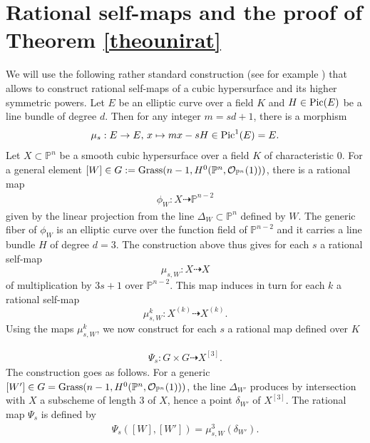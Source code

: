 \documentclass[10pt]{article}
\begin{document}
\section{Rational self-maps and the proof of Theorem \ref{theounirat}\label{sec1}}
 We will use the following  rather standard construction (see for example \cite{bogothschi}) that allows to construct rational self-maps of a cubic hypersurface and its higher symmetric powers. Let $E$ be an elliptic curve over a field $K$ and $H\in{\rm Pic}(E)$ be a line bundle of degree $d$. Then for any integer $m=sd+1$, there is a morphism
$$\mu_s:E\rightarrow E,\,x\mapsto mx-sH\in{\rm Pic}^1(E)=E.$$
Let $X\subset \mathbb{P}^n$ be a smooth cubic hypersurface over a field $K$ of characteristic $0$. For a general element $[W]\in G:={\rm Grass}(n-1, H^0(\mathbb{P}^n,\mathcal{O}_{\mathbb{P}^n}(1)))$, there is a rational map
\begin{eqnarray}\label{eqphiw}\phi_W: X\dashrightarrow \mathbb{P}^{n-2}\end{eqnarray}
given by the linear projection from the line $\Delta_W\subset \mathbb{P}^{n}$ defined by $W$. The generic fiber of $\phi_W$ is an elliptic curve over the function field of $\mathbb{P}^{n-2}$ and it carries a line bundle $H$ of degree $d=3$. The construction above thus gives for each $s$  a rational self-map
$$\mu_{s,W}: X\dashrightarrow X$$
of multiplication by $3s+1$ over $\mathbb{P}^{n-2}$. This map induces in turn for each $k$ a rational self-map
$$\mu_{s,W}^{k}: X^{(k)}\dashrightarrow X^{(k)}.$$
Using the  maps $\mu_{s,W}^{k}$, we now  construct for each $s$ a rational map defined over $K$

\begin{eqnarray}\label{eqPsi}\Psi_s: G\times G\dashrightarrow X^{[3]}.\end{eqnarray}
The construction goes as follows.
 For a generic  $[W']\in G={\rm Grass}(n-1, H^0(\mathbb{P}^n,\mathcal{O}_{\mathbb{P}^n}(1)))$, the line $\Delta_{W'}$ produces by intersection with $X$ a subscheme of length $3$ of $X$, hence a point  $\delta_{W'}$ of $X^{[3]}$.
 The rational map $\Psi_s$  is defined by
 \begin{eqnarray} \label{eqpsiexpli}
\Psi_s([W],[W'])=\mu_{s,W}^{3}(\delta_{W'}).\end{eqnarray}
\end{document}
